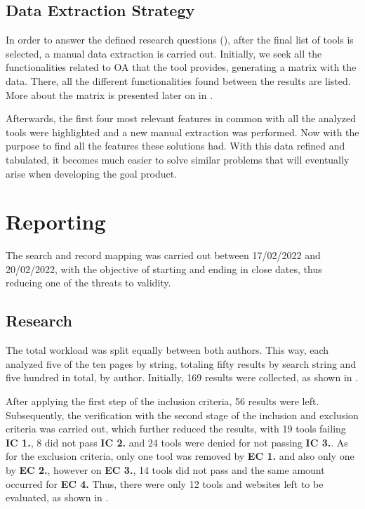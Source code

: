

\subsection{Data Extraction Strategy}\label{sec:gl-planning-datastrategy}

In order to answer the defined research questions (), after the final list of tools is selected, a manual data extraction is carried out. Initially, we seek all the functionalities related to \ac{OA} that the tool provides, generating a matrix with the data. There, all the different functionalities found between the results are listed. More about the matrix is presented later on in .

Afterwards, the first four most relevant features in common with all the analyzed tools were highlighted and a new manual extraction was performed. Now with the purpose to find all the features these solutions had. With this data refined and tabulated, it becomes much easier to solve similar problems that will eventually arise when developing the goal product.

\section{Reporting}\label{sec:gl-reporting}

The search and record mapping was carried out between 17/02/2022 and 20/02/2022, with the objective of starting and ending in close dates, thus reducing one of the threats to validity.

\subsection{Research}\label{sec:gl-research}

The total workload was split equally between both authors. This way, each analyzed five of the ten pages by string, totaling fifty results by search string and five hundred in total, by author. Initially, 169 results were collected, as shown in .

After applying the first step of the inclusion criteria, 56 results were left. Subsequently, the verification with the second stage of the inclusion and exclusion criteria was carried out, which further reduced the results, with 19 tools failing \textbf{IC 1.}, 8 did not pass \textbf{IC 2.} and 24 tools were denied for not passing \textbf{IC 3.}. As for the exclusion criteria, only one tool was removed by \textbf{EC 1.} and also only one by \textbf{EC 2.}, however on \textbf{EC 3.}, 14 tools did not pass and the same amount occurred for \textbf{EC 4.} Thus, there were only 12 tools and websites left to be evaluated, as shown in .

